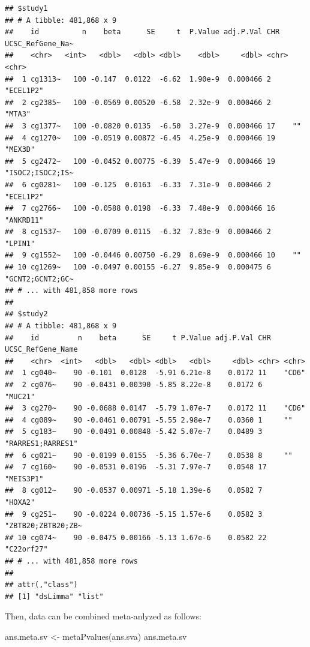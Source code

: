 \documentclass[
]{book}
\newenvironment{Shaded}{\begin{snugshade}}{\end{snugshade}}
\newcommand{\FunctionTok}[1]{\textcolor[rgb]{0.00,0.00,0.00}{#1}}
\newcommand{\NormalTok}[1]{#1}
\newcommand{\OtherTok}[1]{\textcolor[rgb]{0.56,0.35,0.01}{#1}}
\begin{document}
\begin{verbatim}
## $study1
## # A tibble: 481,868 x 9
##    id          n    beta      SE     t  P.Value adj.P.Val CHR   UCSC_RefGene_Na~
##    <chr>   <int>   <dbl>   <dbl> <dbl>    <dbl>     <dbl> <chr> <chr>           
##  1 cg1313~   100 -0.147  0.0122  -6.62  1.90e-9  0.000466 2     "ECEL1P2"       
##  2 cg2385~   100 -0.0569 0.00520 -6.58  2.32e-9  0.000466 2     "MTA3"          
##  3 cg1377~   100 -0.0820 0.0135  -6.50  3.27e-9  0.000466 17    ""              
##  4 cg1270~   100 -0.0519 0.00872 -6.45  4.25e-9  0.000466 19    "MEX3D"         
##  5 cg2472~   100 -0.0452 0.00775 -6.39  5.47e-9  0.000466 19    "ISOC2;ISOC2;IS~
##  6 cg0281~   100 -0.125  0.0163  -6.33  7.31e-9  0.000466 2     "ECEL1P2"       
##  7 cg2766~   100 -0.0588 0.0198  -6.33  7.48e-9  0.000466 16    "ANKRD11"       
##  8 cg1537~   100 -0.0709 0.0115  -6.32  7.83e-9  0.000466 2     "LPIN1"         
##  9 cg1552~   100 -0.0446 0.00750 -6.29  8.69e-9  0.000466 10    ""              
## 10 cg1269~   100 -0.0497 0.00155 -6.27  9.85e-9  0.000475 6     "GCNT2;GCNT2;GC~
## # ... with 481,858 more rows
## 
## $study2
## # A tibble: 481,868 x 9
##    id         n    beta      SE     t P.Value adj.P.Val CHR   UCSC_RefGene_Name 
##    <chr>  <int>   <dbl>   <dbl> <dbl>   <dbl>     <dbl> <chr> <chr>             
##  1 cg040~    90 -0.101  0.0128  -5.91 6.21e-8    0.0172 11    "CD6"             
##  2 cg076~    90 -0.0431 0.00390 -5.85 8.22e-8    0.0172 6     "MUC21"           
##  3 cg270~    90 -0.0688 0.0147  -5.79 1.07e-7    0.0172 11    "CD6"             
##  4 cg089~    90 -0.0461 0.00791 -5.55 2.98e-7    0.0360 1     ""                
##  5 cg183~    90 -0.0491 0.00848 -5.42 5.07e-7    0.0489 3     "RARRES1;RARRES1" 
##  6 cg021~    90 -0.0199 0.0155  -5.36 6.70e-7    0.0538 8     ""                
##  7 cg160~    90 -0.0531 0.0196  -5.31 7.97e-7    0.0548 17    "MEIS3P1"         
##  8 cg012~    90 -0.0537 0.00971 -5.18 1.39e-6    0.0582 7     "HOXA2"           
##  9 cg251~    90 -0.0224 0.00736 -5.15 1.57e-6    0.0582 3     "ZBTB20;ZBTB20;ZB~
## 10 cg074~    90 -0.0475 0.00166 -5.13 1.67e-6    0.0582 22    "C22orf27"        
## # ... with 481,858 more rows
## 
## attr(,"class")
## [1] "dsLimma" "list"
\end{verbatim}

Then, data can be combined meta-anlyzed as follows:

\begin{Shaded}
\begin{Highlighting}[]
\NormalTok{ans.meta.sv }\OtherTok{\textless{}{-}} \FunctionTok{metaPvalues}\NormalTok{(ans.sva)}
\NormalTok{ans.meta.sv}
\end{Highlighting}
\end{Shaded}
\end{document}
